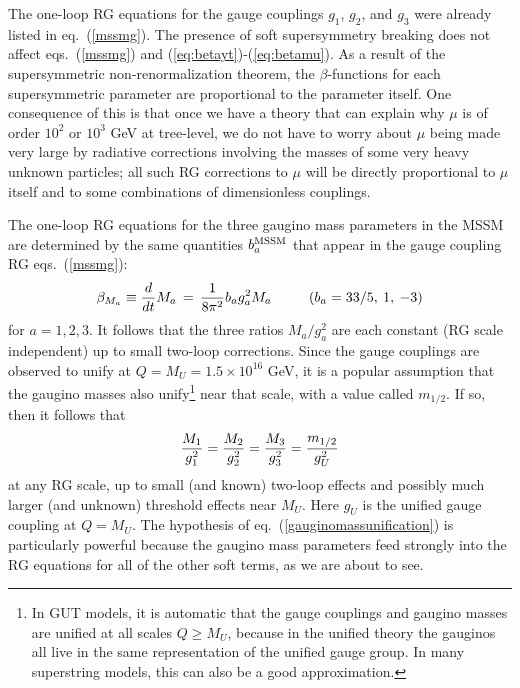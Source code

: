 \documentclass[12pt]{article}
\def\beq{\begin{eqnarray}}
\def\eeq{\end{eqnarray}}
\begin{document}
The one-loop RG equations for the gauge couplings $g_1$, $g_2$, and $g_3$
were already listed in eq.~(\ref{mssmg}).  The presence of soft
supersymmetry breaking does not affect eqs.~(\ref{mssmg}) and
(\ref{eq:betayt})-(\ref{eq:betamu}). As a result of the
supersymmetric non-renormalization theorem, the $\beta$-functions  
for each supersymmetric
parameter are proportional to the parameter itself.  One consequence of
this is that once we have a theory that can explain why $\mu$ is of order
$10^2$ or $10^3$ GeV at tree-level, we do not have to worry about $\mu$
being made very large by radiative corrections involving the masses of
some very heavy unknown particles; all such RG corrections to $\mu$ will
be directly proportional to $\mu$ itself and to some combinations of
dimensionless couplings. 

The one-loop RG equations for the three gaugino mass parameters in the
MSSM are determined by the same quantities $b_a^{\rm MSSM}$ that appear in
the gauge coupling RG eqs.~(\ref{mssmg}): 
\beq
\beta_{M_a} \equiv
{d\over dt} M_a \,=\, {1\over 8\pi^2} b_a g_a^2 M_a\qquad\>\>\>
(b_a = 33/5, \>1,\>-3)
\label{gauginomassrge}
\eeq
for $a=1,2,3$. It follows that the three ratios $M_a/g_a^2$ are each
constant (RG scale independent) up to small two-loop corrections.  Since
the gauge couplings are observed to unify at $Q = M_U = 1.5 \times 10^{16}$
GeV, it is a popular assumption that the gaugino masses also
unify\footnote{In GUT models, it is automatic that the gauge couplings
and gaugino masses are unified at all scales $Q\geq M_U$, because in the
unified theory the gauginos all live in the same representation of the
unified gauge group. In many superstring models, this can also be a good
approximation.} near that scale, with a value called $m_{1/2}$. 
If so, then it follows that
\beq
{M_1 \over g_1^2} =
{M_2 \over g_2^2} =
{M_3 \over g_3^2} = {m_{1/2} \over g_U^2}
\label{gauginomassunification}
\eeq
at any RG scale, up to small (and known) two-loop effects and possibly
much larger (and unknown) threshold effects near $M_U$. Here $g_U$ is
the unified gauge coupling at $Q = M_U$. The hypothesis of
eq.~(\ref{gauginomassunification}) is particularly powerful because the
gaugino mass parameters feed strongly into the RG equations for all of the
other soft terms, as we are about to see. 
\end{document}
